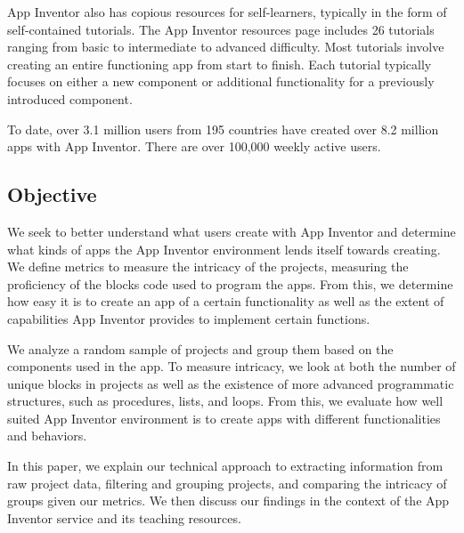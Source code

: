 \documentclass[conference]{IEEEtran}
\begin{document}
App Inventor also has copious resources for self-learners, typically in the form of self-contained tutorials. The App Inventor resources page includes 26 tutorials ranging from basic to intermediate to advanced difficulty. Most tutorials involve creating an entire functioning app from start to finish. Each tutorial typically focuses on either a new component or additional functionality for a previously introduced component.\cite{ai_tutorials}

To date, over 3.1 million users from 195 countries have created over 8.2 million apps with App Inventor. There are over 100,000 weekly active users.\cite{ai_home}

\subsection{Objective}
We seek to better understand what users create with App Inventor and determine what kinds of apps the App Inventor environment lends itself towards creating. We define metrics to measure the intricacy of the projects, measuring the proficiency of the blocks code used to program the apps. From this, we determine how easy it is to create an app of a certain functionality as well as the extent of capabilities App Inventor provides to implement certain functions. 

We analyze a random sample of projects and group them based on the components used in the app. To measure intricacy, we look at both the number of unique blocks in projects as well as the existence of more advanced programmatic structures, such as procedures, lists, and loops. From this, we evaluate how well suited App Inventor environment is to create apps with different functionalities and behaviors.

In this paper, we explain our technical approach to extracting information from raw project data, filtering and grouping projects, and comparing the intricacy of groups given our metrics.  We then discuss our findings in the context of the App Inventor service and its teaching resources.
\end{document}
